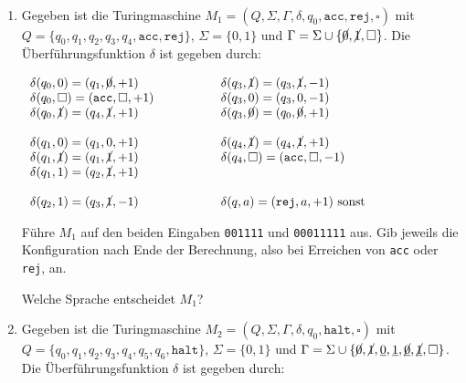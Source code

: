 \documentclass{uebung_cs}
\begin{document}
\begin{aufgabe}[Turingmaschinen I]\
	\begin{enumerate}
		\item Gegeben ist die Turingmaschine $M_1 = (Q,\Sigma,\Gamma,\delta,q_0,\texttt{acc},\mathtt{rej},\square)$ mit\\
		$Q = \{q_0,q_1,q_2,q_3,q_4,\mathtt{acc},\mathtt{rej}\}$, $\Sigma = \{0,1\}$ und $\Gamma = \Sigma \cup \{\cancel{0},\cancel{1},\square\}$. Die Überführungsfunktion $\delta$ ist gegeben durch:
		
		\[\begin{tabular}{p{5cm}p{7.2cm}}
			$\delta(q_0,0) = (q_1,\cancel{0},+1)$ & $\delta(q_3,\cancel{1}) = (q_3,\cancel{1},-1)$\\
			$\delta(q_0,\square) = (\mathtt{acc},\square ,+1)$ &  $\delta(q_3,0) = (q_3,0,-1)$\\
			$\delta(q_0,\cancel{1}) = (q_4,\cancel{1},+1)$ & $\delta(q_3,\cancel{0}) = (q_0,\cancel{0},+1)$\\
			& \\
			$\delta(q_1,0) = (q_1,0,+1)$ & $\delta(q_4,\cancel{1}) = (q_4,\cancel{1},+1)$\\
			$\delta(q_1,\cancel{1}) = (q_1,\cancel{1},+1)$ &  $\delta(q_4,\square) = (\mathtt{acc},\square ,-1)$\\
			$\delta(q_1,1) = (q_2,\cancel{1},+1)$ & \\
			& \\
			$\delta(q_2,1) = (q_3,\cancel{1},-1)$ & $\delta(q,a) = (\mathtt{rej},a,+1)$ sonst\\
		\end{tabular}\]
		
		Führe $M_1$ auf den beiden Eingaben \texttt{001111} und \texttt{00011111} aus. Gib jeweils die Konfiguration nach Ende der Berechnung, also bei Erreichen von \texttt{acc} oder \texttt{rej}, an.
		
		Welche Sprache entscheidet $M_1$?
		
		\item Gegeben ist die Turingmaschine $M_2 = (Q,\Sigma,\Gamma,\delta,q_0,\mathtt{halt},\square)$ mit\\
		$Q = \{q_0,q_1,q_2,q_3,q_4,q_5,q_6,\mathtt{halt}\}$, $\Sigma = \{0,1\}$ und $\Gamma = \Sigma \cup \{\cancel{0},\cancel{1},\underline{0},\underline{1},\underline{\cancel{0}},\underline{\cancel{1}},\square\}$.
    Die Überführungsfunktion $δ$ ist gegeben durch:
		

\end{enumerate}
\end{aufgabe}
\end{document}
